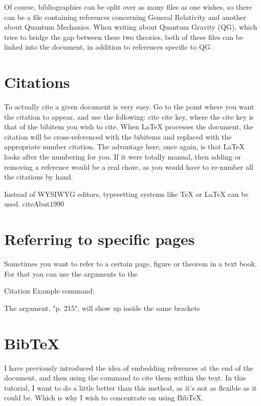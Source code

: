 Of course, bibliographies can be split over as many files as one wishes, so there can be a file containing references concerning General Relativity and another about Quantum Mechanics. When writing about Quantum Gravity (QG), which tries to bridge the gap between these two theories, both of these files can be linked into the document, in addition to references specific to QG.

\section{Citations}

To actually cite a given document is very easy. Go to the point where you want the citation to appear, and use the following: cite cite key, where the cite key is that of the bibitem you wish to cite. When LaTeX processes the document, the citation will be cross-referenced with the bibitems and replaced with the appropriate number citation. The advantage here, once again, is that LaTeX looks after the numbering for you. If it were totally manual, then adding or removing a reference would be a real chore, as you would have to re-number all the citations by hand.

Instead of WYSIWYG editors, typesetting systems like TeX or LaTeX \citep{lamport2004} can be used. cite{Abut1990}

\section{Referring to specific pages}

Sometimes you want to refer to a certain page, figure or theorem in a text book. For that you can use the arguments to the 

\begin{texexample}{Citation Example}{}
 command:
\cite[p. 215]{Mittelbach2004}
\end{texexample}

The argument, "p. 215", will show up inside the same brackets

\section{BibTeX}

I have previously introduced the idea of embedding references at the end of the document, and then using the  command to cite them within the text. In this tutorial, I want to do a little better than this method, as it's not as flexible as it could be. Which is why I wish to concentrate on using BibTeX.

